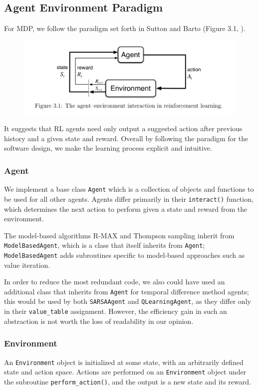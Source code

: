 \documentclass{pset}
\begin{document}
\subsection{Agent Environment Paradigm}
For MDP, we follow the paradigm set forth in Sutton and Barto (Figure 3.1,
\cite{sutton1998reinforcement}).
\begin{figure}[ht]
\begin{center}
\centerline{\includegraphics[width=\textwidth]{img/agent_environment.png}}
\end{center}
\end{figure}
It suggests that RL agents need only output a suggested action after previous history and a given state and reward.  Overall by following the paradigm for the software design, we make the learning process explicit and intuitive.

\subsubsection{Agent}
We implement a base class \texttt{Agent} which is a collection of objects and functions to be used for all other agents. Agents differ primarily in their \texttt{interact()} function, which determines the next action to perform given a state and reward from the environment.

The model-based algorithms R-MAX and Thompson sampling inherit from \texttt{ModelBasedAgent}, which is a class that itself inherits from \texttt{Agent}; \texttt{ModelBasedAgent} adds subroutines specific to model-based approaches such as value iteration.

In order to reduce the most redundant code, we also could have used an
additional class that inherits from \texttt{Agent} for temporal difference method agents; this
would be used by both \texttt{SARSAAgent} and \texttt{QLearningAgent}, as they
differ only in their \texttt{value\_table} assignment. However, the efficiency gain in such an
abstraction is not worth the loss of readability in our opinion.

\subsubsection{Environment}
An \texttt{Environment} object is initialized at some state, with an arbitrarily
defined state and action space. Actions are performed on an \texttt{Environment}
object under the subroutine \texttt{perform\_action()}, and the output is a new state and its reward.
\end{document}
